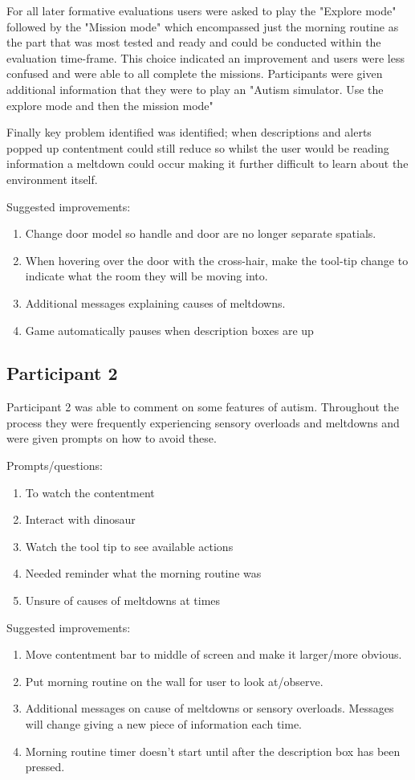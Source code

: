 \documentclass[11pt]{report}
\begin{document}
For all later formative evaluations users were asked to play the "Explore mode" followed by the "Mission mode" which encompassed just the morning routine as the part that was most tested and ready and could be conducted within the evaluation time-frame. This choice indicated an improvement and users were less confused and were able to all complete the missions. Participants were given additional information that they were to play an "Autism simulator. Use the explore mode and then the mission mode"

Finally key problem identified  was identified; when descriptions and alerts popped up contentment could still reduce so whilst the user would be reading information a meltdown could occur making it further difficult to learn about the environment itself.

Suggested improvements:
\begin{enumerate}
\item Change door model so handle and door are no longer separate spatials. 
\item When hovering over the door with the cross-hair, make the tool-tip change to indicate what the room they will be moving into. 
\item Additional messages explaining causes of meltdowns.
\item Game automatically pauses when description boxes are up
\end{enumerate}

\subsection*{Participant 2} 
Participant 2 was able to comment on some features of autism. Throughout the process they were frequently experiencing sensory overloads and meltdowns and were given prompts on how to avoid these.

Prompts/questions:
\begin{enumerate}
\item To watch the contentment
\item Interact with dinosaur
\item Watch the tool tip to see available actions
\item Needed reminder what the morning routine was
\item Unsure of causes of meltdowns at times
\end{enumerate}

Suggested improvements:
\begin{enumerate}
\item Move contentment bar to middle of screen and make it larger/more obvious. 
\item Put morning routine on the wall for user to look at/observe. 
\item Additional messages on cause of meltdowns or sensory overloads. Messages will change giving a new piece of information each time.
\item Morning routine timer doesn't start until after the description box has been pressed. 
\end{enumerate}
\end{document}

